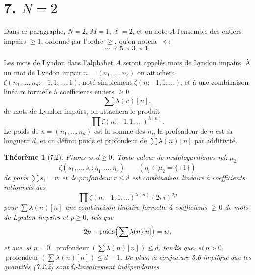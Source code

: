 \documentclass[10pt,a4paper]{article}
\newcommand{\Q}{\mathbb Q}
\theoremstyle{deligne}
\newtheorem*{theorem*}{Théorème}
\newcommand{\heading}[1]{\vspace{0.65em}\noindent{\bfseries #1}\quad}
\begin{document}
\section*{7. \(N=2\)}

Dans ce paragraphe, \(N=2\), \(M=1\), \(\ell=2\), et on note \(A\) l'ensemble des entiers impairs \(\ge1\), ordonné par l'ordre \(\ge\), qu'on notera \(\prec\):
\[
\cdots\prec5\prec3\prec1.
\]

\heading{7.1.} Les mots de Lyndon dans l'alphabet \(A\) seront appelés mots de Lyndon impairs. À un mot de Lyndon impair \(n=(n_1,\ldots,n_d)\) on attachera \(\zeta(n_1,\ldots,n_d;-1,1,\ldots,1)\), noté simplement \(\zeta(n;-1,1,\ldots)\), et à une combinaison linéaire formelle à coefficients entiers \(\ge0\),
\[
\sum\lambda(n)[n],
\]
de mots de Lyndon impairs, on attachera le produit
\[
\prod\zeta(n;-1,1,\ldots)^{\lambda(n)}.
\]
Le poids de \(n=(n_1,\ldots,n_d)\) est la somme des \(n_i\), la profondeur de \(n\) est sa longueur \(d\), et on définit poids et profondeur de \(\sum\lambda(n)[n]\) par additivité.

\begin{theorem*}[7.2]
Fixons \(w,d\ge0\). Toute valeur de multilogarithmes rel. \(\mu_2\)
\[
\tag{7.2.1}
\zeta(s_1,\ldots,s_r;\eta_1,\ldots,\eta_r)\qquad(\eta_i\in\mu_2=\{\pm1\})
\]
de poids \(\sum s_i=w\) et de profondeur \(r\le d\) est combinaison linéaire à coefficients rationnels des
\[
\tag{7.2.2}
\prod\zeta(n;-1,1,\ldots)^{\lambda(n)}(2\pi i)^{2p}
\]
pour \(\sum\lambda(n)[n]\) une combinaison linéaire formelle à coefficients \(\ge0\) de mots de Lyndon impairs et \(p\ge0\), tels que
\[
2p+\operatorname{poids}\Bigl(\sum\lambda(n)[n]\Bigr)=w,
\]
et que, si \(p=0\), \(\operatorname{profondeur}(\sum\lambda(n)[n])\le d\), tandis que, si \(p>0\), \(\operatorname{profondeur}(\sum\lambda(n)[n])\le d-1\). De plus, la conjecture 5.6 implique que les quantités (7.2.2) sont \(\Q\)-linéairement indépendantes.
\end{theorem*}
\end{document}
